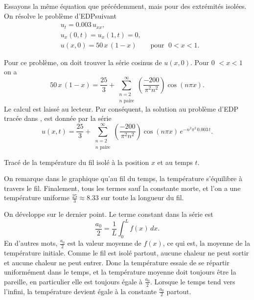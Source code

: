 \begin{example}
Essayons la même équation que précédemment,  mais pour des extrémités isolées.
On résolve le problème d'EDPsuivant
\begin{align*}
& u_t = 0.003 \, u_{xx} , \\
& u_x(0,t) = u_x(1,t) = 0 , \\
& u(x,0) = 50\,x\,(1-x) \qquad \text{pour } \; 0 < x < 1 .
\end{align*}

Pour ce problème,  on doit trouver la série cosinus de $ u (x, 0) $.
Pour 0 $ <x <1 $ on a
\begin{equation*}
50\, x\,(1-x)
=
\frac{25}{3} +
\sum_{\substack{n=2 \\ n \text{ paire}}}^\infty
\left( \frac{-200}{\pi^2 n^2} \right)
\cos (n \pi x) .
\end{equation*}
Le calcul est laissé au lecteur.
Par conséquent,  la solution au problème d'EDP tracée dans
,  est donnée par la série
\begin{equation*}
u(x,t)
=
\frac{25}{3} +
\sum_{\substack{n=2 \\ n \text{ paire}}}^\infty
\left( \frac{-200}{\pi^2 n^2} \right)
\cos ( n \pi x)
\, e^{-n^2 \pi^2 \, 0.003 \, t} .
\end{equation*}

\begin{myfig}
\capstart
{}
\caption{Tracé de la température du fil isolé à la position $ x $ et
au temps $ t $. \label{heat:wireisolexfig}}
\end{myfig}

On remarque dans le graphique
qu'au fil du temps,  la température s'équilibre à travers le fil.  Finalement,  tous les
termes sauf la constante
morte,  et l'on a une température uniforme
 $\frac{25}{3} \approx 8.33$ sur toute la longueur du fil.
\end{example}

On développe sur le dernier point.  Le terme constant dans la série est
\begin{equation*}
\frac{a_0}{2} = \frac{1}{L} \int_0^L f(x) \, dx .
\end{equation*}
En d'autres mots,  $\frac{a_0}{2}$ est la valeur moyenne de $f(x)$, ce qui est,
la moyenne de la température initiale.  Comme le fil est isolé
partout,  aucune chaleur ne peut sortir et aucune chaleur ne peut entrer.  Donc la température
essaie de se répartir uniformément dans le temps,  et la température moyenne doit toujours être la
pareille, en particulier elle est toujours égale à $\frac{a_0}{2}$.  
Lorsque le temps tend vers l'infini,  la température devient égale à la constante $\frac{a_0}{2}$ partout.

